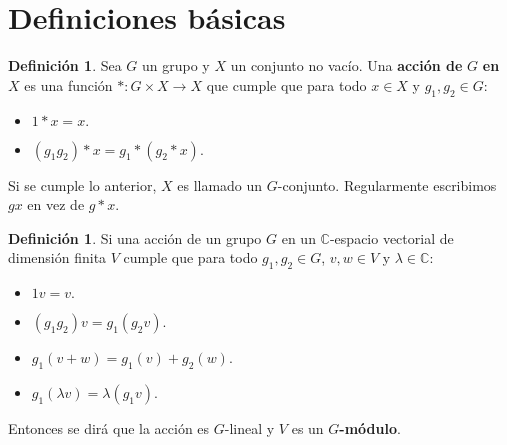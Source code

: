 \documentclass[12pt]{book}
\theoremstyle{definition}
\newtheorem{definition}[theorem]{Definición}
\newcounter{in}
\newcounter{ini}
\begin{document}
\section{Definiciones básicas}
\label{sec:basicas}

\begin{definition}
  Sea $G$ un grupo y $X$ un conjunto no vacío. Una \textbf{acción de}
  $G$ \textbf{en} $X$ es una función $\ast \colon G \times X \to X$
  que cumple que para todo $x \in X$ y $g_1,g_2 \in G$:
  \begin{itemize}
  \item $1 \ast x = x.$
    \item $(g_1g_2) \ast x = g_1 \ast (g_2 \ast x)$.
  \end{itemize}
\end{definition}

Si se cumple lo anterior, $X$ es llamado un $G$-conjunto. Regularmente
escribimos $gx$ en vez de $g \ast x$.

\begin{definition}
  Si una acción de un grupo $G$ en un $\mathbb{C}$-espacio vectorial de
  dimensión finita $V$ cumple que para todo $g_1,g_2 \in G$, $v,w \in V$ y
  $\lambda \in \mathbb{C}$:
  \begin{itemize}
  \item $1v = v.$
  \item $(g_1g_2)v = g_1(g_2v).$
  \item $g_1(v+w) = g_1(v) + g_2(w).$
    \item $g_1(\lambda v) = \lambda (g_1v).$
    \end{itemize}
    Entonces se dirá que la acción es $G$-lineal y $V$ es un
    $G$\textbf{-módulo}.
\end{definition}
\end{document}

